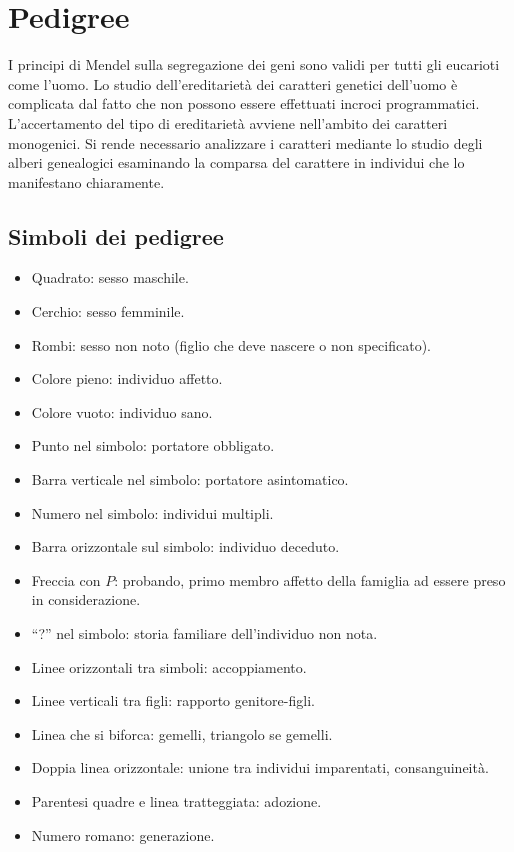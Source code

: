 \chapter{Pedigree}
I principi di Mendel sulla segregazione dei geni sono validi per tutti gli eucarioti come l'uomo. Lo studio dell'ereditariet\`a dei caratteri genetici dell'uomo \`e complicata dal
fatto che non possono essere effettuati incroci programmatici. L'accertamento del tipo di ereditariet\`a avviene nell'ambito dei caratteri monogenici. Si rende necessario analizzare
i caratteri mediante lo studio degli alberi genealogici esaminando la comparsa del carattere in individui che lo manifestano chiaramente. 

\section{Simboli dei pedigree}

\begin{multicols}{2}
	\begin{itemize}
		\item Quadrato: sesso maschile.
		\item Cerchio: sesso femminile.
		\item Rombi: sesso non noto (figlio che deve nascere o non specificato).
		\item Colore pieno: individuo affetto.
		\item Colore vuoto: individuo sano.
		\item Punto nel simbolo: portatore obbligato.
		\item Barra verticale nel simbolo: portatore asintomatico.
		\item Numero nel simbolo: individui multipli.
		\item Barra orizzontale sul simbolo: individuo deceduto.
		\item Freccia con $P$: probando, primo membro affetto della famiglia ad essere preso in considerazione.
		\item ``?'' nel simbolo: storia familiare dell'individuo non nota. 
		\item Linee orizzontali tra simboli: accoppiamento.
		\item Linee verticali tra figli: rapporto genitore-figli.
		\item Linea che si biforca: gemelli, triangolo se gemelli.
		\item Doppia linea orizzontale: unione tra individui imparentati, consanguineit\`a.
		\item Parentesi quadre e linea tratteggiata: adozione.
		\item Numero romano: generazione. 
	\end{itemize}
\end{multicols}

